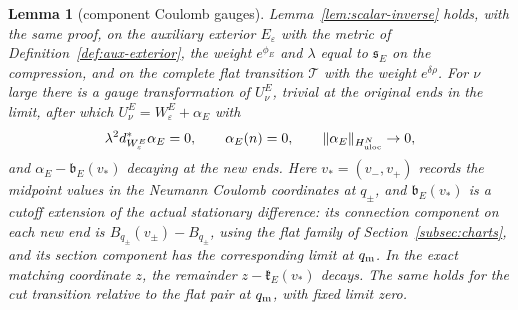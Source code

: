 \documentclass[11pt]{amsart}
\newtheorem{lemma}[theorem]{Lemma}
\theoremstyle{definition}
\theoremstyle{remark}
\theoremstyle{plain}
\numberwithin{equation}{section}
\newcommand{\eps}{\varepsilon}
\begin{document}
\begin{lemma}[component Coulomb gauges]\label{lem:component-gauge}
Lemma~\ref{lem:scalar-inverse} holds, with the same proof, on the auxiliary
exterior $E_\eps$ with the metric of Definition~\ref{def:aux-exterior}, the weight
$e^{\phi_E}$ and $\lambda$ equal to ${\mathfrak s}_E$ on the compression, and on the complete
flat transition $\mathcal T$ with the weight $e^{\delta\rho}$. For $\nu$ large there is a
gauge transformation of $U^E_\nu$, trivial at the original ends in the limit, after
which $U^E_\nu=W^E_\eps+\alpha_E$ with
\[
\lambda^2d^*_{W^E_\eps}\alpha_E=0,\qquad \alpha_E(n)=0,\qquad
\|\alpha_E\|_{H^N_{\rm uloc}}\to0,
\]
and $\alpha_E-\mathfrak b_E(v_*)$ decaying at the new ends. Here $v_*=(v_-,v_+)$
records the midpoint values in the Neumann Coulomb coordinates at $q_\pm$, and
$\mathfrak b_E(v_*)$ is a cutoff extension of the actual stationary difference:
its connection component on each new end is $B_{q_\pm}(v_\pm)-B_{q_\pm}$,
using the flat family of Section~\ref{subsec:charts}, and its section component
has the corresponding limit at $q_{\rm m}$. In the exact matching coordinate
$z$, the remainder $z-\mathfrak k_E(v_*)$ decays. The same holds for the cut transition relative to
the flat pair at $q_{\rm m}$, with fixed limit zero.
\end{lemma}
\end{document}
